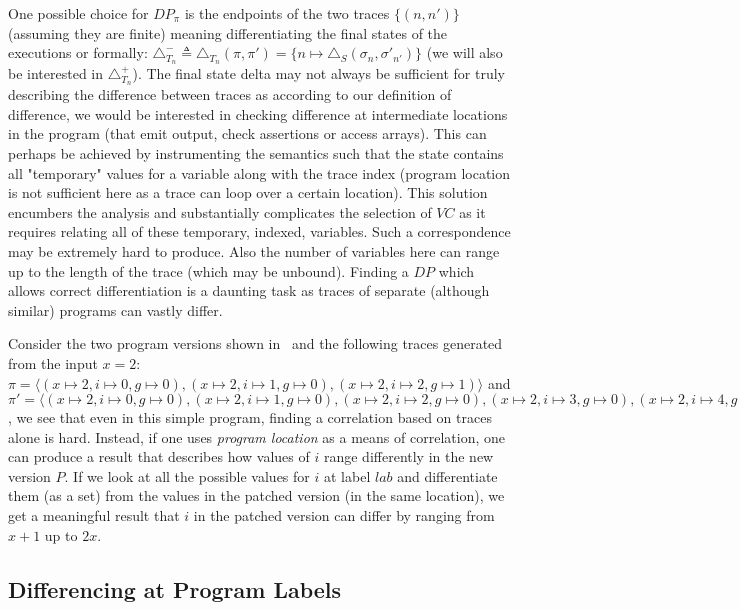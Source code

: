 One possible choice for $DP_{\pi}$ is the endpoints of the two traces $\{(n,n')\}$ (assuming they are finite) meaning differentiating the final states of the executions or formally: $\triangle_{T_{n}}^{-} \triangleq \triangle_{T_{n}}(\pi,\pi') = \{n \mapsto \triangle_{S}(\sigma_{n},\sigma'_{n'})\}$ (we will also be interested in $\triangle_{T_{n}}^{+}$). The final state delta may not always be sufficient for truly describing the difference between traces as according to our definition of difference, we would be interested in checking difference at intermediate locations in the program (that emit output, check assertions or access arrays). This can perhaps be achieved by instrumenting the semantics such that the state contains all "temporary" values for a variable along with the trace index (program location is not sufficient here as a trace can loop over a certain location). This solution encumbers the analysis and substantially complicates the selection of $VC$ as it requires relating all of these temporary, indexed, variables. Such a correspondence may be extremely hard to produce. Also the number of variables here can range up to the length of the trace (which may be unbound). Finding a $DP$ which allows correct differentiation is a daunting task as traces of separate (although similar) programs can vastly differ.

\begin{Example}
Consider the two program versions shown in~ and the following traces generated from the input $x=2$: $\pi = \langle (x \mapsto 2,i \mapsto 0, g \mapsto 0),(x \mapsto 2,i \mapsto 1, g \mapsto 0),(x \mapsto 2,i \mapsto 2, g \mapsto 1) \rangle$ and $\pi' = \langle (x \mapsto 2,i \mapsto 0, g \mapsto 0),(x \mapsto 2,i \mapsto 1, g \mapsto 0),(x \mapsto 2,i \mapsto 2, g \mapsto 0),(x \mapsto 2,i \mapsto 3, g \mapsto 0),(x \mapsto 2,i \mapsto 4, g \mapsto 1)\rangle$, we see that even in this simple program, finding a correlation based on traces alone is hard.
Instead, if one uses \emph{program location} as a means of correlation, one can produce a result that describes how values of $i$ range differently in the new version $P$. If we look at all the possible values for $i$ at label $lab$ and differentiate them (as a set) from the values in the patched version (in the same location), we get a meaningful result that $i$ in the patched version can differ by ranging from $x+1$ up to $2x$.
\end{Example}


\subsection{Differencing at Program Labels} 

